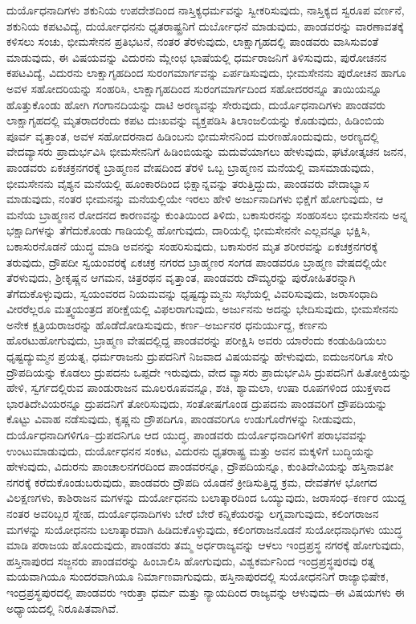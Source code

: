 ದುರ್ಯೊಧನಾದಿಗಳು ಶಕುನಿಯ ಉಪದೇಶದಿಂದ ನಾಸ್ತಿಕ್ಯಧರ್ಮವನ್ನು ಸ್ವೀಕರಿಸುವುದು, ನಾಸ್ತಿಕ್ಯದ ಸ್ವರೂಪ ವರ್ಣನೆ, ಶಕುನಿಯ ಕಪಟವಿದ್ಯೆ, ದುರ್ಯೋಧನನು ಧೃತರಾಷ್ಟ್ರನಿಗೆ ದುರ್ಬೋಧನೆ ಮಾಡುವುದು, ಪಾಂಡವರನ್ನು ವಾರಣಾವತಕ್ಕೆ ಕಳಿಸಲು ಸಂಚು, ಭೀಮಸೇನನ ಪ್ರತಿಭಟನೆ, ನಂತರ ತೆರಳುವುದು, ಲಾಕ್ಷಾಗೃಹದಲ್ಲಿ ಪಾಂಡವರು ವಾಸಿಸುವಂತೆ ಮಾಡುವುದು, ಈ ವಿಷಯವನ್ನು ವಿದುರನು ಮ್ಲೇಂಛ ಭಾಷೆಯಲ್ಲಿ ಧರ್ಮರಾಜನಿಗೆ ತಿಳಿಸುವುದು, ಪುರೋಚನನ ಕಪಟವಿದ್ಯೆ, ವಿದುರನು ಲಾಕ್ಷಾಗೃಹದಿಂದ ಸುರಂಗಮಾರ್ಗವನ್ನು ಏರ್ಪಡಿಸುವುದು, ಭೀಮಸೇನನು ಪುರೋಚನ ಹಾಗೂ ಅವಳ ಸಹೋದರಿಯನ್ನು ಸಂಹರಿಸಿ, ಲಾಕ್ಷಾಗೃಹದಿಂದ ಸುರಂಗಮಾರ್ಗದಿಂದ ಸಹೋದರರನ್ನೂ ತಾಯಿಯನ್ನೂ ಹೊತ್ತುಕೊಂಡು ಹೋಗಿ ಗಂಗಾನದಿಯನ್ನು ದಾಟಿ ಅರಣ್ಯವನ್ನು ಸೇರುವುದು, ದುರ್ಯೊಧನಾದಿಗಳು ಪಾಂಡವರು ಲಾಕ್ಷಾಗೃಹದಲ್ಲಿ ಮೃತರಾದರೆಂದು ಕಪಟ ದುಃಖವನ್ನು ವ್ಯಕ್ತಪಡಿಸಿ ತಿಲಾಂಜಲಿಯನ್ನು ಕೊಡುವುದು, ಹಿಡಿಂಬಿಯ ಪೂರ್ವ ವೃತ್ತಾಂತ, ಅವಳ ಸಹೋದರನಾದ ಹಿಡಿಂಬನು ಭೀಮಸೇನನಿಂದ ಮರಣಹೊಂದುವುದು, ಅರಣ್ಯದಲ್ಲಿ ವೇದವ್ಯಾಸರು ಪ್ರಾದುರ್ಭವಿಸಿ ಭೀಮಸೇನನಿಗೆ ಹಿಡಿಂಬಿಯನ್ನು ಮದುವೆಯಾಗಲು ಹೇಳುವುದು, ಘಟೋತ್ಕಚನ ಜನನ, ಪಾಂಡವರು ಏಕಚಕ್ರನಗರಕ್ಕೆ ಬ್ರಾಹ್ಮಣನ ವೇಷದಿಂದ ತೆರಳಿ ಒಬ್ಬ ಬ್ರಾಹ್ಮಣನ ಮನೆಯಲ್ಲಿ ವಾಸಮಾಡುವುದು, ಭೀಮಸೇನನು ವೈಶ್ಯನ ಮನೆಯಲ್ಲಿ ಹೂಂಕಾರದಿಂದ ಭಿಕ್ಷಾನ್ನವನ್ನು ತರುತ್ತಿದ್ದುದು, ಪಾಂಡವರು ವೇದಾಭ್ಯಾಸ ಮಾಡುವುದು, ನಂತರ ಭೀಮನನ್ನು ಮನೆಯಲ್ಲಿಯೇ ಇರಲು ಹೇಳಿ ಅರ್ಜುನಾದಿಗಳು ಭಿಕ್ಷೆಗೆ ಹೋಗುವುದು, ಆ ಮನೆಯ ಬ್ರಾಹ್ಮಣನ ರೋದನದ ಕಾರಣವನ್ನು ಕುಂತಿಯಿಂದ ತಿಳಿದು, ಬಕಾಸುರನನ್ನು ಸಂಹರಿಸಲು ಭೀಮಸೇನನು ಅನ್ನ ಭಕ್ಷಾದಿಗಳನ್ನು ತೆಗೆದುಕೊಂಡು ಗಾಡಿಯಲ್ಲಿ ಹೋಗುವುದು, ದಾರಿಯಲ್ಲಿ ಭೀಮಸೇನನೇ ಎಲ್ಲವನ್ನೂ ಭಕ್ಷಿಸಿ, ಬಕಾಸುರನೊಡನೆ ಯುದ್ಧ ಮಾಡಿ ಅವನನ್ನು ಸಂಹರಿಸುವುದು, ಬಕಾಸುರನ ಮೃತ ಶರೀರವನ್ನು ಏಕಚಕ್ರನಗರಕ್ಕೆ ತರುವುದು, ದ್ರೌಪದೀ ಸ್ವಯಂವರಕ್ಕೆ ಏಕಚಕ್ರ ನಗರದ ಬ್ರಾಹ್ಮಣರ ಸಂಗಡ ಪಾಂಡವರೂ ಬ್ರಾಹ್ಮಣ ವೇಷದಲ್ಲಿಯೇ ತೆರಳುವುದು, ಶ‍್ರೀಕೃಷ್ಣನ ಆಗಮನ, ಚಿತ್ರರಥನ ವೃತ್ತಾಂತ, ಪಾಂಡವರು ದೌಮ್ಯರನ್ನು ಪುರೋಹಿತರನ್ನಾಗಿ ತೆಗೆದುಕೊಳ್ಳುವುದು, ಸ್ವಯಂವರದ ನಿಯಮವನ್ನು ಧೃಷ್ಟದ್ಯುಮ್ಮನು ಸಭೆಯಲ್ಲಿ ವಿವರಿಸುವುದು, ಜರಾಸಂಧಾದಿ ವೀರರೆಲ್ಲರೂ ಮತ್ತ್ವಯಂತ್ರದ ಪರೀಕ್ಷೆಯಲ್ಲಿ ವಿಫಲರಾಗುವುದು, ಅರ್ಜುನನು ಅದನ್ನು ಭೇದಿಸುವುದು, ಭೀಮಸೇನನು ಅನೇಕ ಕ್ಷತ್ರಿಯರಾಜರನ್ನು ಹೊಡೆದೋಡಿಸುವುದು, ಕರ್ಣ–ಅರ್ಜುನರ ಧನುರ್ಯುದ್ದ, ಕರ್ಣನು ಹೊರಟುಹೋಗುವುದು, ಬ್ರಾಹ್ಮಣ ವೇಷದಲ್ಲಿದ್ದ ಪಾಂಡವರನ್ನು ಪರೀಕ್ಷಿಸಿ ಅವರು ಯಾರೆಂದು ಕಂಡುಹಿಡಿಯಲು ಧೃಷ್ಟದ್ಯುಮ್ಮನ ಪ್ರಯತ್ನ, ಧರ್ಮರಾಜನು ದ್ರುಪದನಿಗೆ ನಿಜವಾದ ವಿಷಯವನ್ನು ಹೇಳುವುದು, ಐದುಜನರಿಗೂ ಸೇರಿ ದ್ರೌಪದಿಯನ್ನು ಕೊಡಲು ದ್ರುಪದನು ಒಪ್ಪದೇ ಇರುವುದು, ವೇದ ವ್ಯಾಸರು ಪ್ರಾದುರ್ಭವಿಸಿ ದ್ರುಪದನಿಗೆ ಹಿತೋಕ್ತಿಯನ್ನು ಹೇಳಿ, ಸ್ವರ್ಗದಲ್ಲಿರುವ ಪಾಂಡುರಾಜನ ಮೂಲರೂಪವನ್ನೂ, ಶಚಿ, ಶ್ಯಾಮಲಾ, ಉಷಾ ರೂಪಗಳಿಂದ ಯುಕ್ತಳಾದ ಭಾರತಿದೇವಿಯರನ್ನೂ ದ್ರುಪದನಿಗೆ ತೋರಿಸುವುದು, ಸಂತೋಷಗೊಂಡ ದ್ರುಪದನು ಪಾಂಡವರಿಗೆ ದ್ರೌಪದಿಯನ್ನು ಕೊಟ್ಟು ವಿವಾಹ ನಡೆಸುವುದು, ಕೃಷ್ಣನು ದ್ರೌಪದಿಗೂ, ಪಾಂಡವರಿಗೂ ಉಡುಗೊರೆಗಳನ್ನು ನೀಡುವುದು, ದುರ್ಯೊಧನಾದಿಗಳಿಗೂ–ದ್ರುಪದನಿಗೂ ಆದ ಯುದ್ಧ, ಪಾಂಡವರು ದುರ್ಯೊಧನಾದಿಗಳಿಗೆ ಪರಾಭವವನ್ನು ಉಂಟುಮಾಡುವುದು, ದುರ್ಯೋಧನನ ಸಂಕಟ, ವಿದುರನು ಧೃತರಾಷ್ಟ್ರ ಮತ್ತು ಅವನ ಮಕ್ಕಳಿಗೆ ಬುದ್ಧಿಯನ್ನು ಹೇಳುವುದು, ವಿದುರನು ಪಾಂಚಾಲನಗರದಿಂದ ಪಾಂಡವರನ್ನೂ, ದ್ರೌಪದಿಯನ್ನೂ, ಕುಂತಿದೇವಿಯನ್ನು ಹಸ್ತಿನಾವತೀ ನಗರಕ್ಕೆ ಕರೆದುಕೊಂಡುಬರುವುದು, ಪಾಂಡವರು ದ್ರೌಪದಿ ಯೊಡನೆ ಕ್ರೀಡಿಸುತ್ತಿದ್ದ ಕ್ರಮ, ದೇವತೆಗಳ ಭೋಗದ ವಿಲಕ್ಷಣಗಳು, ಕಾಶಿರಾಜನ ಮಗಳನ್ನು ದುರ್ಯೋಧನನು ಬಲಾತ್ಕಾರದಿಂದ ಒಯ್ಯುವುದು, ಜರಾಸಂಧ–ಕರ್ಣರ ಯುದ್ದ ನಂತರ ಅವರಿಬ್ಬರ ಸ್ನೇಹ, ದುರ್ಯೊಧನಾದಿಗಳು ಬೇರೆ ಬೇರೆ ಕನ್ನಿಕೆಯರನ್ನು ಲಗ್ನವಾಗುವುದು, ಕಲಿಂಗರಾಜನ ಮಗಳನ್ನು ಸುಯೋಧನನು ಬಲಾತ್ಕಾರವಾಗಿ ಹಿಡಿದುಕೊಳ್ಳುವುದು, ಕಲಿಂಗರಾಜನೊಡನೆ ಸುಯೋಧನಾಧಿಗಳು ಯುದ್ಧ ಮಾಡಿ ಪರಾಜಯ ಹೊಂದುವುದು, ಪಾಂಡವರು ತಮ್ಮ ಅರ್ಧರಾಜ್ಯವನ್ನು ಆಳಲು ಇಂದ್ರಪ್ರಸ್ಥ ನಗರಕ್ಕೆ ಹೋಗುವುದು, ಹಸ್ತಿನಾಪುರದ ಸಜ್ಜನರು ಪಾಂಡವರನ್ನು ಹಿಂಬಾಲಿಸಿ ಹೋಗುವುದು, ವಿಶ್ವಕರ್ಮನಿಂದ ಇಂದ್ರಪ್ರಸ್ಥಪುರವು ರತ್ನ ಮಯವಾಗಿಯೂ ಸುಂದರವಾಗಿಯೂ ನಿರ್ಮಾಣವಾಗುವುದು, ಹಸ್ತಿನಾಪುರದಲ್ಲಿ ಸುಯೋಧನನಿಗೆ ರಾಜ್ಯಾಭಿಷೇಕ, ಇಂದ್ರಪ್ರಸ್ಥಪುರದಲ್ಲಿ ಪಾಂಡವರು ಇರುತ್ತಾ ಧರ್ಮ ಮತ್ತು ನ್ಯಾಯದಿಂದ ರಾಜ್ಯವನ್ನು ಆಳುವುದು–ಈ ವಿಷಯಗಳು ಈ ಅಧ್ಯಾಯದಲ್ಲಿ ನಿರೂಪಿತವಾಗಿವೆ.


